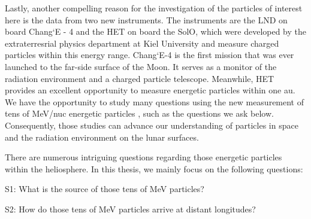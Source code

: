 Lastly, another compelling reason for the investigation of the particles of interest here is the data from two new instruments. The instruments are the \ac{LND} on board Chang`E - 4 and the \ac{HET} on board the \ac{SolO}, which were developed by the extraterresrial physics department at Kiel University and measure charged particles within this energy range. Chang`E-4 is the first mission that was ever launched to the far-side surface of the Moon. It serves as a monitor of the radiation environment and a charged particle telescope. Meanwhile, \ac{HET} provides an excellent opportunity to measure energetic particles within one au. We have the opportunity to study many questions using the new measurement of tens of MeV/nuc energetic particles \citep{Wimmer2020SSRv,RodriguezPacheco-2019-EPD}, such as the questions we ask below.
Consequently, those studies can advance our understanding of particles in space and the radiation environment on the lunar surfaces.



There are numerous intriguing questions regarding those energetic particles within the heliosphere. In this thesis, we mainly focus on the following questions:


\begin{tcolorbox}[colback=blue!5!white,colframe=blue!75!black,title=Scientific questions - \acp{SEP}]
	S1: What is the source of those tens of MeV particles?  \\
	\hfill

	S2: How do those tens of MeV particles arrive at distant longitudes?
	
\end{tcolorbox}
	

